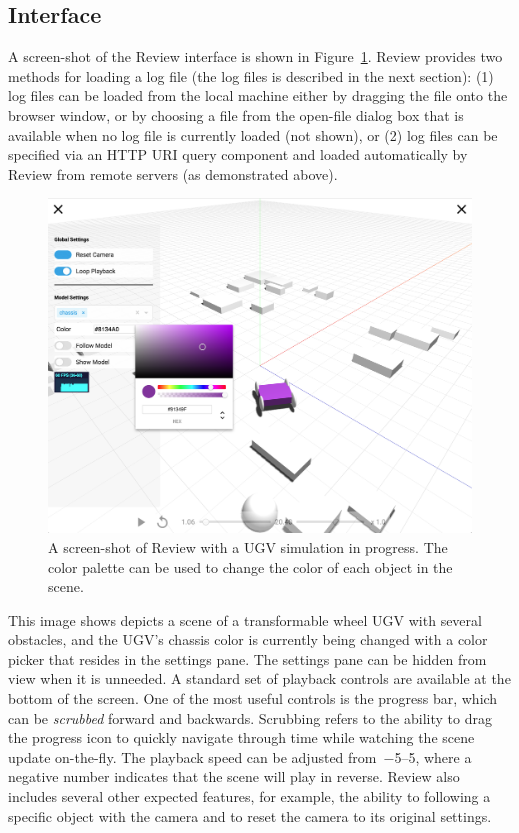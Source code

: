 \subsection{Interface}


A screen-shot of the Review interface is shown in Figure~\ref{fig:review_screenshot}.
%
Review provides two methods for loading a log file (the log files is described in the next section):
(1) log files can be loaded from the local machine either by dragging the file onto the browser window, or by choosing a file from the open-file dialog box that is available when no log file is currently loaded (not shown), or
(2) log files can be specified via an HTTP URI query component and loaded automatically by Review from remote servers (as demonstrated above).


\begin{figure}[htb!]
\centering
\includegraphics[width=0.9\columnwidth]{figures/review-screenshot.png}
\caption{A screen-shot of Review with a UGV simulation in progress. The color palette can be used to change the color of each object in the scene.}
\label{fig:review_screenshot}
\end{figure}


This image shows depicts a scene of a transformable wheel UGV with several obstacles, and the UGV's chassis color is currently being changed with a color picker that resides in the settings pane.
%
The settings pane can be hidden from view when it is unneeded.
%
A standard set of playback controls are available at the bottom of the screen.
%
One of the most useful controls is the progress bar, which can be \emph{scrubbed} forward and backwards. Scrubbing refers to the ability to drag the progress icon to quickly navigate through time while watching the scene update on-the-fly.
%
The playback speed can be adjusted from~\numrange{-5}{5}, where a negative number indicates that the scene will play in reverse.
%
Review also includes several other expected features, for example, the ability to following a specific object with the camera and to reset the camera to its original settings.




